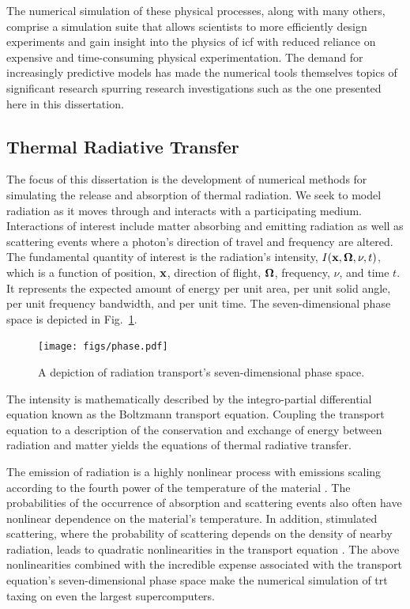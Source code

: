 \documentclass[../doc.tex]{subfiles}
\begin{document}
The numerical simulation of these physical processes, along with many others, comprise a simulation suite that allows scientists to more efficiently design experiments and gain insight into the physics of \gls{icf} with reduced reliance on expensive and time-consuming physical experimentation. 
The demand for increasingly predictive models has made the numerical tools themselves topics of significant research spurring research investigations such as the one presented here in this dissertation.  

\subsection{Thermal Radiative Transfer}
The focus of this dissertation is the development of numerical methods for simulating the release and absorption of thermal radiation. We seek to model radiation as it moves through and interacts with a participating medium. 
Interactions of interest include matter absorbing and emitting radiation as well as scattering events where a photon's direction of travel and frequency are altered. 
The fundamental quantity of interest is the radiation's intensity, $I(\boldsymbol{\mathrm{x}},\boldsymbol{\Omega},\nu,t)$, which is a function of position, $\boldsymbol{\mathrm{x}}$, direction of flight, $\boldsymbol{\Omega}$, frequency, $\nu$, and time $t$. It represents the expected amount of energy per unit area, per unit solid angle, per unit frequency bandwidth, and per unit time. 
The seven-dimensional phase space is depicted in Fig.~\ref{intro:phase}. 
\begin{figure}
\centering
\texttt{[image: figs/phase.pdf]}
\caption{A depiction of radiation transport's seven-dimensional phase space. }
\label{intro:phase}
\end{figure}
The intensity is mathematically described by the integro-partial differential equation known as the Boltzmann transport equation. 
Coupling the transport equation to a description of the conservation and exchange of energy between radiation and matter yields the equations of thermal radiative transfer. 

The emission of radiation is a highly nonlinear process with emissions scaling according to the fourth power of the temperature of the material \cite{pomraning2005equations}. The probabilities of the occurrence of absorption and scattering events also often have nonlinear dependence on the material's temperature. 
In addition, stimulated scattering, where the probability of scattering depends on the density of nearby radiation, leads to quadratic nonlinearities in the transport equation \cite{1986JQSRT..36..273K}. 
The above nonlinearities combined with the incredible expense associated with the transport equation's seven-dimensional phase space make the numerical simulation of \gls{trt} taxing on even the largest supercomputers. 
\end{document}
